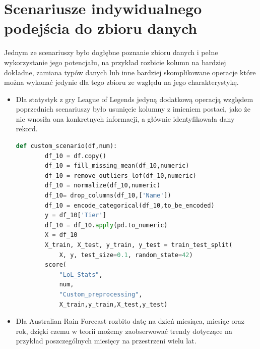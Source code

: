 \documentclass[oneside]{book}
\begin{document}
\section{Scenariusze indywidualnego podejścia do zbioru danych}
Jednym ze scenariuszy było dogłębne poznanie zbioru danych i pełne 
wykorzystanie jego potencjału, na przykład rozbicie kolumn na bardziej dokładne,
zamiana typów danych lub inne bardziej skomplikowane operacje które można wykonać 
jedynie dla tego zbioru ze względu na jego charakterystykę.

\begin{itemize}
\item Dla statystyk z gry League of Legends jedyną dodatkową operacją względem poprzednich scenariuszy było usunięcie kolumny z 
imieniem postaci, jako że nie wnosiła ona konkretnych informacji, 
a głównie identyfikowała dany rekord.

\begin{lstlisting}[language=Python, caption={Indywidualny 
    scenariusz dla zestawu danych LoL Stats}, captionpos=b]
    def custom_scenario(df,num):
        df_10 = df.copy()
        df_10 = fill_missing_mean(df_10,numeric)
        df_10 = remove_outliers_lof(df_10,numeric)
        df_10 = normalize(df_10,numeric)
        df_10= drop_columns(df_10,['Name'])
        df_10 = encode_categorical(df_10,to_be_encoded)
        y = df_10['Tier']
        df_10 = df_10.apply(pd.to_numeric)
        X = df_10
        X_train, X_test, y_train, y_test = train_test_split(
            X, y, test_size=0.1, random_state=42)
        score(
            "LoL_Stats",
            num,
            "Custom_preprocessing",
            X_train,y_train,X_test,y_test)
\end{lstlisting}

\item Dla Australian Rain Forecast rozbito datę na dzień miesiąca, 
miesiąc oraz rok, dzięki czemu w teorii możemy zaobserwować 
trendy dotyczące na przykład poszczególnych miesięcy na przestrzeni 
wielu lat.


\end{itemize}
\end{document}
